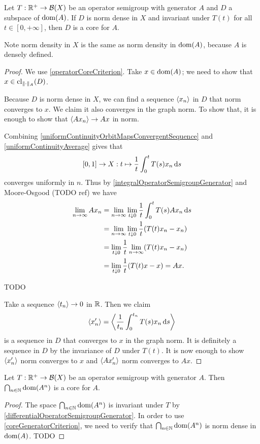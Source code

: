 \begin{proposition} \label{coreGeneratorCriterion}
Let $T: \mathbb{R}^+\to \operatorname{\mathcal{B}}(X)$ be an operator semigroup with generator $A$ and $D$ a subspace of $\operatorname{dom}(A)$. If $D$ is norm dense in $X$ and invariant under $T(t)$ for all $t\in [0,+\infty]$, then $D$ is a core for $A$.
\end{proposition}
Note norm density in $X$ is the same as norm density in $\operatorname{dom}(A)$, because $A$ is densely defined.
\begin{proof}
We use \ref{operatorCoreCriterion}. Take $x\in \operatorname{dom}(A)$; we need to show that $x\in\operatorname{cl}_{\lVert\cdot\rVert_A}(D)$.

Because $D$ is norm dense in $X$, we can find a sequence $\left\langle x_n \right\rangle$ in $D$ that norm converges to $x$. We claim it also converges in the graph norm. To show that, it is enough to show that $\left\langle Ax_n \right\rangle \to Ax$ in norm.

Combining \ref{uniformContinuityOrbitMapsConvergentSequence} and \ref{uniformContinuityAverage} gives that
\[ [0,1] \to X: t\mapsto \frac{1}{t}\int_0^t T(s)x_n\operatorname{d \!}{s} \]
converges uniformly in $n$. Thus by \ref{integralOperatorSemigroupGenerator} and Moore-Osgood (TODO ref) we have
\begin{align*}
\lim_{n\to \infty} Ax_n &= \lim_{n\to \infty} \lim_{t\downarrow 0}\frac{1}{t}\int_0^t T(s)Ax_n \operatorname{d \!}{s} \\
&= \lim_{n\to \infty} \lim_{t\downarrow 0}\frac{1}{t}(T(t)x_n - x_n) \\
&= \lim_{t\downarrow 0}\frac{1}{t}\lim_{n\to \infty}(T(t)x_n - x_n) \\
&= \lim_{t\downarrow 0}\frac{1}{t}(T(t)x - x) = Ax.
\end{align*}

TODO

Take a sequence $\left\langle t_n \right\rangle\to 0$ in $\mathbb{R}$. Then we claim
\[ \left\langle x'_n \right\rangle = \left\langle \frac{1}{t_n}\int_0^{t_n}T(s)x_n\operatorname{d \!}{s} \right\rangle \]
is a sequence in $D$ that converges to $x$ in the graph norm. It is definitely a sequence in $D$ by the invariance of $D$ under $T(t)$. It is now enough to show $\left\langle x'_n \right\rangle$ norm converges to $x$ and $\left\langle Ax'_n \right\rangle$ norm converges to $Ax$.
\end{proof}

\begin{proposition} \label{domAinftyCore}
Let $T: \mathbb{R}^+\to \operatorname{\mathcal{B}}(X)$ be an operator semigroup with generator $A$. Then $\bigcap_{n\in\mathbb{N}}\operatorname{dom}(A^n)$ is a core for $A$.
\end{proposition}
\begin{proof}
The space $\bigcap_{n\in\mathbb{N}}\operatorname{dom}(A^n)$ is invariant under $T$ by \ref{differentialOperatorSemigroupGenerator}. In order to use \ref{coreGeneratorCriterion}, we need to verify that $\bigcap_{n\in\mathbb{N}}\operatorname{dom}(A^n)$ is norm dense in $\operatorname{dom} (A)$. TODO
\end{proof}


